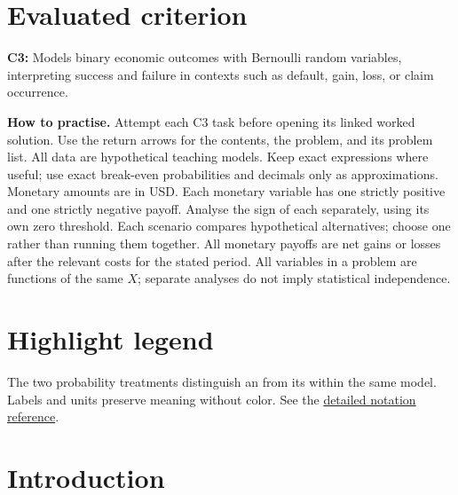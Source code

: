 \maketitle
\setcounter{tocdepth}{1}
\setcounter{secnumdepth}{2}
\label{toc}
\tableofcontents
\section*{Evaluated criterion}
\textbf{C3:} Models binary economic outcomes with Bernoulli random variables, interpreting success and failure in contexts such as default, gain, loss, or claim occurrence.

\textbf{How to practise.} Attempt each C3 task before opening its linked worked solution.
Use the return arrows for the contents, the problem, and its problem list.
All data are hypothetical teaching models. Keep exact expressions where useful;
use exact break-even probabilities and decimals only as approximations. Monetary amounts are in USD.
Each monetary variable has one strictly positive and one strictly negative payoff.
Analyse the sign of each  separately, using its own zero threshold.
Each scenario compares hypothetical alternatives; choose one rather than running them together.
All monetary payoffs are net gains or losses after the relevant costs for the stated period.
All variables in a problem are functions of the same $X$; separate analyses do
not imply statistical independence.


\clearpage\section*{Highlight legend}
\label{tab:highlight-legend}

The two probability treatments distinguish an  from its  within
the same model. Labels and units preserve meaning without color.
See the \hyperref[tab:notation-reference]{detailed notation reference}.

\section{Introduction}\label{sec:t2-c3-introduction}
